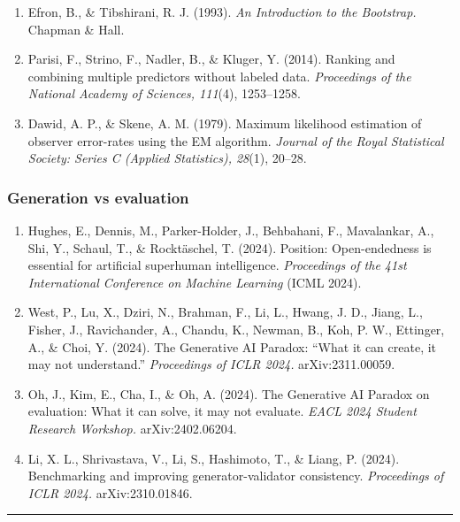 \begin{enumerate}
\def\labelenumi{\arabic{enumi}.}
\setcounter{enumi}{32}
\tightlist
\item
  Efron, B., \& Tibshirani, R. J. (1993). \emph{An Introduction to the Bootstrap.} Chapman \& Hall.
\item
  Parisi, F., Strino, F., Nadler, B., \& Kluger, Y. (2014). Ranking and combining multiple predictors without labeled data. \emph{Proceedings of the National Academy of Sciences, 111}(4), 1253--1258.
\item
  Dawid, A. P., \& Skene, A. M. (1979). Maximum likelihood estimation of observer error-rates using the EM algorithm. \emph{Journal of the Royal Statistical Society: Series C (Applied Statistics), 28}(1), 20--28.
\end{enumerate}

\subsubsection{Generation vs evaluation}\label{generation-vs-evaluation}

\begin{enumerate}
\def\labelenumi{\arabic{enumi}.}
\setcounter{enumi}{35}
\tightlist
\item
  Hughes, E., Dennis, M., Parker-Holder, J., Behbahani, F., Mavalankar, A., Shi, Y., Schaul, T., \& Rocktäschel, T. (2024). Position: Open-endedness is essential for artificial superhuman intelligence. \emph{Proceedings of the 41st International Conference on Machine Learning} (ICML 2024).
\item
  West, P., Lu, X., Dziri, N., Brahman, F., Li, L., Hwang, J. D., Jiang, L., Fisher, J., Ravichander, A., Chandu, K., Newman, B., Koh, P. W., Ettinger, A., \& Choi, Y. (2024). The Generative AI Paradox: ``What it can create, it may not understand.'' \emph{Proceedings of ICLR 2024.} arXiv:2311.00059.
\item
  Oh, J., Kim, E., Cha, I., \& Oh, A. (2024). The Generative AI Paradox on evaluation: What it can solve, it may not evaluate. \emph{EACL 2024 Student Research Workshop.} arXiv:2402.06204.
\item
  Li, X. L., Shrivastava, V., Li, S., Hashimoto, T., \& Liang, P. (2024). Benchmarking and improving generator-validator consistency. \emph{Proceedings of ICLR 2024.} arXiv:2310.01846.
\end{enumerate}

\begin{center}\rule{0.5\linewidth}{0.5pt}\end{center}

